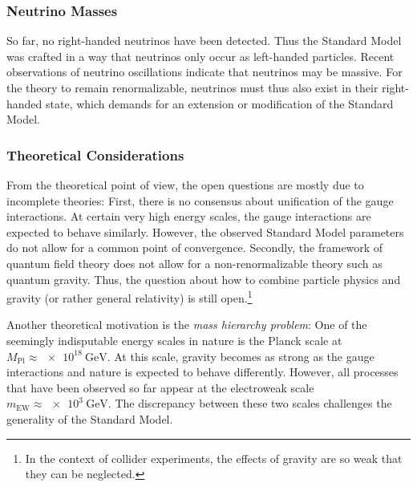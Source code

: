 \subsubsection{Neutrino Masses}
So far, no right-handed neutrinos have been detected. Thus the Standard Model was crafted in a way that neutrinos only occur as left-handed particles.
Recent observations of neutrino oscillations\cite{KamLAND:ReactorAntineutrinoMeasurement,DoubleChooz:Improvedmeasurementsneutrino,IceCube:Determiningneutrinooscillation,DayaBay:NewMeasurementAntineutrino} indicate that neutrinos may be massive. For the theory to remain renormalizable, neutrinos must thus also exist in their right-handed state\cite{Klinkhamer:NeutrinomassStandard}, which demands for an extension or modification of the Standard Model.

\subsubsection{Theoretical Considerations}
From the theoretical point of view, the open questions are mostly due to incomplete theories: 
First, there is no consensus about unification of the gauge interactions. At certain very high energy scales, the gauge interactions are expected to behave similarly. However, the observed Standard Model parameters do not allow for a common point of convergence\cite{Amaldi:Comparisongrandunified}.
Secondly, the framework of quantum field theory does not allow for a non-renormalizable theory such as quantum gravity. Thus, the question about how to combine particle physics and gravity (or rather general relativity) is still open.\footnote{In the context of collider experiments, the effects of gravity are so weak that they can be neglected.}

Another theoretical motivation is the \emph{mass hierarchy problem}: One of the seemingly indisputable energy scales in nature is the Planck scale at $M_\text{Pl} \approx \SI{e18}{\GeV}$. At this scale, gravity becomes as strong as the gauge interactions and nature is expected to behave differently. However, all processes that have been observed so far appear at the electroweak scale $m_\text{EW} \approx \SI{e3}{\GeV}$. The discrepancy between these two scales challenges the generality of the Standard Model.


